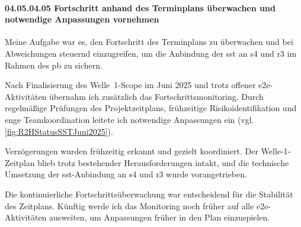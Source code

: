\paragraph*{04.05.04.05 Fortschritt anhand des Terminplans überwachen und notwendige Anpassungen vornehmen}
\label{para:04.05.04.05_FortschrittAnhandDesTerminplansUeberwachenUndNotwendigeAnpassungenVornehmen}

\par Meine Aufgabe war es, den Fortschritt des Terminplans zu überwachen und bei Abweichungen steuernd einzugreifen, um die Anbindung der \gls{sst} an \gls{s4} und \gls{r3} im Rahmen des \gls{pb} zu sichern.

\par Nach Finalisierung des Welle~1-Scope im Juni 2025 und trotz offener \gls{e2e}-Aktivitäten übernahm ich zusätzlich das Fortschrittsmonitoring. Durch regelmäßige Prüfungen des Projektzeitplans, frühzeitige Risikoidentifikation und enge Teamkoordination leitete ich notwendige Anpassungen ein (vgl. \autoref{fig:R2HStatusSSTJuni2025}).

\par Verzögerungen wurden frühzeitig erkannt und gezielt koordiniert. Der Welle-1-Zeitplan blieb trotz bestehender Herausforderungen intakt, und die technische Umsetzung der \gls{sst}-Anbindung an \gls{s4} und \gls{r3} wurde vorangetrieben.

\par Die kontinuierliche Fortschrittsüberwachung war entscheidend für die Stabilität des Zeitplans. Künftig werde ich das Monitoring noch früher auf alle \gls{e2e}-Aktivitäten ausweiten, um Anpassungen früher in den Plan einzuspielen.